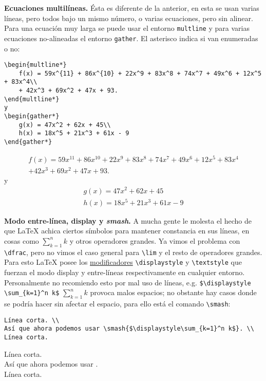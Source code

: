 \documentclass[intro-breve-latex.tex]{subfiles}
\begin{document}
\textbf{Ecuaciones multilíneas.}
Ésta es diferente de la anterior, en esta se usan varias líneas, pero todos bajo un mismo número, o varias ecuaciones,
pero sin alinear. Para una ecuación muy larga se puede usar el entorno \texttt{multline} y para varias ecuaciones
no-alineadas el entorno \texttt{gather}. El asterisco indica si van enumeradas o no:
\begin{lstlisting}
\begin{multline*}
	f(x) = 59x^{11} + 86x^{10} + 22x^9 + 83x^8 + 74x^7 + 49x^6 + 12x^5 + 83x^4\\
	+ 42x^3 + 69x^2 + 47x + 93.
\end{multline*}
y
\begin{gather*}
	g(x) = 47x^2 + 62x + 45\\
	h(x) = 18x^5 + 21x^3 + 61x - 9
\end{gather*}
\end{lstlisting}
\begin{multline*}
	f(x) = 59x^{11} + 86x^{10} + 22x^9 + 83x^8 + 74x^7 + 49x^6 + 12x^5 + 83x^4\\
	+ 42x^3 + 69x^2 + 47x + 93.
\end{multline*}
y
\begin{gather*}
	g(x) = 47x^2 + 62x + 45\\
	h(x) = 18x^5 + 21x^3 + 61x - 9
\end{gather*}

\textbf{Modo entre-línea, display y \textit{smash}.} A mucha gente le molesta el hecho de que \LaTeX{} achica ciertos símbolos para mantener constancia en sus líneas, en cosas como $\sum_{k=1}^n k$ y otros operadores grandes. Ya vimos el problema con \lstinline|\dfrac|, pero no vimos el caso general para \lstinline|\lim| y el resto de operadores grandes. Para esto \LaTeX{} posee los \underline{modificadores} \lstinline|\displaystyle| y \lstinline|\textstyle| que fuerzan el modo display y entre-líneas respectivamente en cualquier entorno. Personalmente no recomiendo esto por mal uso de líneas, e.g. \lstinline|$\displaystyle \sum_{k=1}^n k$| $\displaystyle \sum_{k=1}^n k$ provoca malos espacios; no obstante hay casos donde se podría hacer sin afectar el espacio, para ello está el comando \lstinline|\smash|:
\begin{lstlisting}[basicstyle=\footnotesize\ttfamily]
Línea corta. \\
Así que ahora podemos usar \smash{$\displaystyle\sum_{k=1}^n k$}. \\
Línea corta.
\end{lstlisting}
Línea corta. \\
Así que ahora podemos usar . \\
Línea corta.
\end{document}
